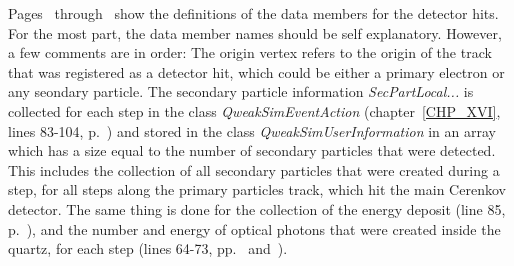 Pages~\pageref{SourceV31} through~\pageref{SourceV35} show the
definitions of the data members for the detector hits. For the most
part, the data member names should be self explanatory. However, a few
comments are in order: The origin vertex refers to the origin of the
track that was registered as a detector hit, which could be either a
primary electron or any seondary particle. The secondary particle
information {\em SecPartLocal...} is collected for each step in the
class {\em QweakSimEventAction} (chapter~\ref{CHP_XVI}, lines 83-104,
p.~\pageref{SourceXVI3}) and stored in the class {\em
QweakSimUserInformation} in an array which has a size equal to the
number of secondary particles that were detected. This includes the
collection of all secondary particles that were created during a step,
for all steps along the primary particles track, which hit the main
Cerenkov detector. The same thing is done for the collection of the
energy deposit (line 85, p.~\pageref{SourceXVI3}), and the number and
energy of optical photons that were created inside the quartz, for
each step (lines 64-73, pp.~\pageref{SourceXVI2}
and~\pageref{SourceXVI3}).


\clearpage

